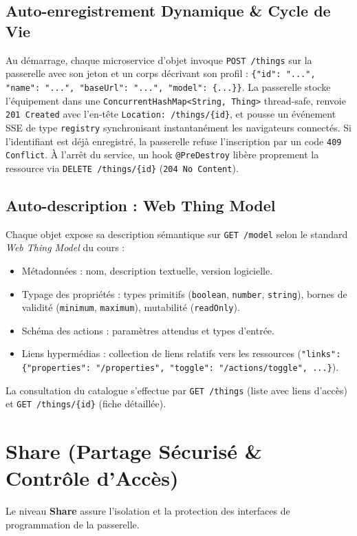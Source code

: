 \documentclass[10pt,a4paper]{article}
\begin{document}
\subsection{Auto-enregistrement Dynamique \& Cycle de Vie}
Au démarrage, chaque microservice d'objet invoque \texttt{POST /things} sur la passerelle avec son jeton et un corps décrivant son profil : \texttt{\{"id": "...", "name": "...", "baseUrl": "...", "model": \{...\}\}}.
La passerelle stocke l'équipement dans une \texttt{ConcurrentHashMap<String, Thing>} thread-safe, renvoie \texttt{201 Created} avec l'en-tête \texttt{Location: /things/\{id\}}, et pousse un événement SSE de type \texttt{registry} synchronisant instantanément les navigateurs connectés. Si l'identifiant est déjà enregistré, la passerelle refuse l'inscription par un code \texttt{409 Conflict}.
À l'arrêt du service, un hook \texttt{@PreDestroy} libère proprement la ressource via \texttt{DELETE /things/\{id\}} (\texttt{204 No Content}).

\subsection{Auto-description : Web Thing Model}
Chaque objet expose sa description sémantique sur \texttt{GET /model} selon le standard \emph{Web Thing Model} du cours :
\begin{itemize}
  \item Métadonnées : nom, description textuelle, version logicielle.
  \item Typage des propriétés : types primitifs (\texttt{boolean}, \texttt{number}, \texttt{string}), bornes de validité (\texttt{minimum}, \texttt{maximum}), mutabilité (\texttt{readOnly}).
  \item Schéma des actions : paramètres attendus et types d'entrée.
  \item Liens hypermédias : collection de liens relatifs vers les ressources (\texttt{"links": \{"properties": "/properties", "toggle": "/actions/toggle", ...\}}).
\end{itemize}
La consultation du catalogue s'effectue par \texttt{GET /things} (liste avec liens d'accès) et \texttt{GET /things/\{id\}} (fiche détaillée).

\section{Share (Partage Sécurisé \& Contrôle d'Accès)}
Le niveau \textbf{Share} assure l'isolation et la protection des interfaces de programmation de la passerelle.
\end{document}

